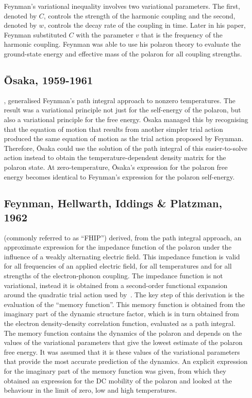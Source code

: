 Feynman's variational inequality involves two variational parameters. The first, denoted by $C$, controls the strength of the harmonic coupling and the second, denoted by $w$, controls the decay rate of the coupling in time. Later in his paper, Feynman substituted $C$ with the parameter $v$ that is the frequency of the harmonic coupling. Feynman was able to use his polaron theory to evaluate the ground-state energy and effective mass of the polaron for all coupling strengths.

\subsection{\=Osaka, 1959-1961}

\cite{osaka_polaron_1959, osaka_theory_1961}, generalised Feynman's path integral approach to nonzero temperatures. The result was a variational principle not just for the self-energy of the polaron, but also a variational principle for the free energy. \=Osaka managed this by recognising that the equation of motion that results from another simpler trial action produced the same equation of motion as the trial action proposed by Feynman. Therefore, \=Osaka could use the solution of the path integral of this easier-to-solve action instead to obtain the temperature-dependent density matrix for the polaron state. At zero-temperature, Ōsaka's expression for the polaron free energy becomes identical to Feynman's expression for the polaron self-energy.


\subsection{Feynman, Hellwarth, Iddings \& Platzman, 1962}

\cite{feynman_mobility_1962} (commonly referred to as ``FHIP'') derived, from the path integral approach, an approximate expression for the impedance function of the polaron under the influence of a weakly alternating electric field. This impedance function is valid for all frequencies of an applied electric field, for all temperatures and for all strengths of the electron-phonon coupling. The impedance function is not variational, instead it is obtained from a second-order functional expansion around the quadratic trial action used by~\cite{feynman_slow_1955}. The key step of this derivation is the evaluation of the ``memory function''. This memory function is obtained from the imaginary part of the dynamic structure factor, which is in turn obtained from the electron density-density correlation function, evaluated as a path integral. The memory function contains the dynamics of the polaron and depends on the values of the variational parameters that give the lowest estimate of the polaron free energy. It was assumed that it is these values of the variational parameters that provide the most accurate prediction of the dynamics. An explicit expression for the imaginary part of the memory function was given, from which they obtained an expression for the DC mobility of the polaron and looked at the behaviour in the limit of zero, low and high temperatures.

